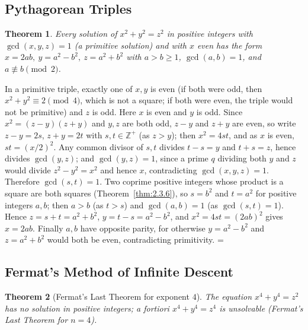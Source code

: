 \documentclass[11pt]{article}
\makeatletter
\let\nt@closedisplay\]
\def\nt@guardedclose{\@ifnextchar\par{\nt@closeafterpar}{\@ifnextchar\end{\postdisplaypenalty\@M\nt@closedisplay}{\nt@closedisplay}}}
\def\nt@closeafterpar\par{\@ifnextchar\par{\nt@closeafterpar}{\@ifnextchar\end{\postdisplaypenalty\@M\nt@closedisplay\par}{\nt@closedisplay\par}}}
\renewenvironment{proof}[1][\proofname]{\par
  \pushQED{\qed}\normalfont\topsep\medskipamount\edef\nt@afterproof{\@endparpenalty=\the\@endparpenalty\relax}\@beginparpenalty\@M\@endparpenalty\@M\let\]\nt@guardedclose\trivlist\item[]\textit{#1\@addpunct{.}} \ignorespaces}{\ifvmode\addpenalty\@M\fi\popQED\nt@afterproof\endtrivlist\@endpefalse}
\theoremstyle{ntstyle}
\newtheorem{theorem}{Theorem}[subsection]
\makeatother
\begin{document}
\subsection{Pythagorean Triples}

\begin{theorem}\label{thm:8.4.1} Every solution of
  $x^2+y^2=z^2$ in positive integers with $\gcd(x,y,z)=1$ (a primitive
  solution) and with $x$ even has the
  form $x=2ab,\ y=a^2-b^2,\ z=a^2+b^2$ with $a>b\ge1$, $\gcd(a, b)=1$, and
  $a\not\equiv b\pmod{2}$.

\end{theorem}

\begin{proof} In a primitive triple, exactly one of $x,y$
  is even (if both were odd, then $x^2+y^2\equiv2\pmod{4}$, which is not a square; if both
  were even, the triple would not be primitive) and $z$ is odd. Here $x$ is even and $y$ is odd. Since
  $x^2=(z-y)(z+y)$ and $y,z$ are both odd, $z-y$ and $z+y$
  are even, so write $z-y=2s$, $z+y=2t$ with $s,t\in\mathbb{Z}^+$ (as
  $z>y$); then $x^2=4st$, and as $x$ is even, $st=(x/2)^2$. Any common
  divisor of $s,t$ divides $t-s=y$ and $t+s=z$, hence divides
  $\gcd(y, z)$; and $\gcd(y, z)=1$, since a prime $q$ dividing both $y$ and
  $z$ would divide $z^2-y^2=x^2$ and hence $x$, contradicting
  $\gcd(x,y,z)=1$. Therefore $\gcd(s, t)=1$. Two coprime positive
  integers whose product is a square are both squares (Theorem~\ref{thm:2.3.6}), so
  $s=b^2$ and $t=a^2$ for positive integers $a,b$; then $a>b$ (as
  $t>s$) and $\gcd(a, b)=1$ (as $\gcd(s, t)=1$). Hence $z=s+t=a^2+b^2$,
  $y=t-s=a^2-b^2$, and $x^2=4st=(2ab)^2$ gives $x=2ab$. Finally $a,b$
  have opposite parity, for otherwise $y=a^2-b^2$ and $z=a^2+b^2$
  would both be even, contradicting primitivity.
\end{proof}
\subsection{Fermat's Method of Infinite Descent}

\begin{theorem}[Fermat's Last Theorem for exponent $4$]\label{thm:8.5.1}\label{thm:fermat-last-theorem-for-exponent-4}
  The equation
  $x^{4}+y^{4}=z^{2}$ has no solution in positive integers; a fortiori
  $x^{4}+y^{4}=z^{4}$ is unsolvable (Fermat's Last Theorem for $n=4$).

\end{theorem}
\end{document}
